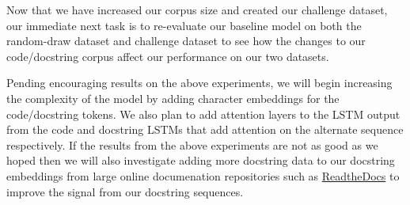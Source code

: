 \documentclass[article, 12pt, oneside]{memoir}
\begin{document}
Now that we have increased our corpus size and created our challenge
dataset, our immediate next task is to re-evaluate our baseline model on
both the random-draw dataset and challenge dataset to see how the
changes to our code/docstring corpus affect our performance on our two
datasets.

Pending encouraging results on the above experiments, we will begin
increasing the complexity of the model by adding character embeddings
for the code/docstring tokens. We also plan to add attention layers to
the LSTM output from the code and docstring LSTMs that add attention on
the alternate sequence respectively. If the results from the above
experiments are not as good as we hoped then we will also investigate
adding more docstring data to our docstring embeddings from large online
documenation repositories such as
\href{https://readthedocs.org/}{ReadtheDocs} to improve the signal from
our docstring sequences.
\end{document}
